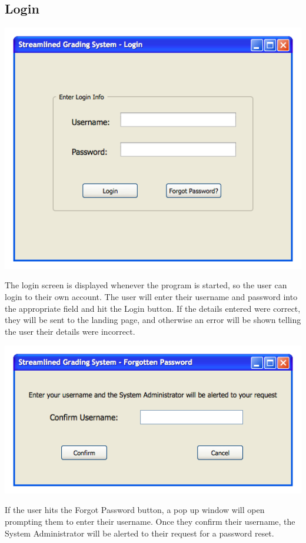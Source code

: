 \documentclass{article}
\begin{document}
\subsection{Login}
\label{login}
\centerline{\includegraphics[scale=0.65]{../images/UIMockups/pngs/loginScreen}}
The login screen is displayed whenever the program is started, so the user can login
to their own account. The user will enter their username and password into the
appropriate field and hit the Login button. If the details entered were correct, they will
be sent to the landing page, and otherwise an error will be shown telling the user their
details were incorrect.\\
\centerline{\includegraphics[scale=0.65]{../images/UIMockups/pngs/forgotPW}}
If the user hits the Forgot Password button, a pop up window will open prompting
them to enter their username. Once they confirm their username, the System 
Administrator will be alerted to their request for a password reset.
\end{document}
